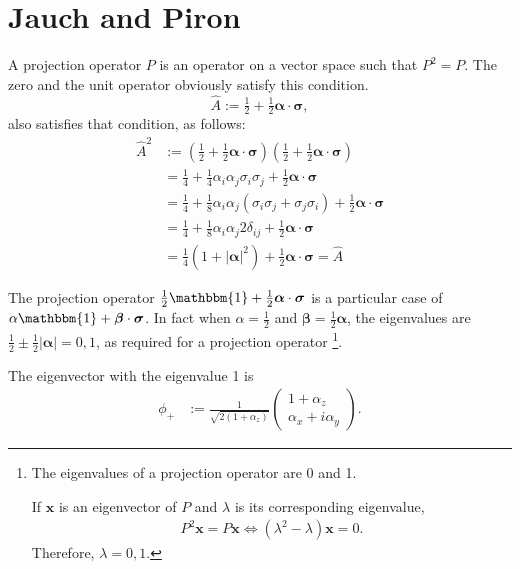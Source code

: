 \documentclass[12pt]{article}
\begin{document}
\section{Jauch and Piron}
A projection operator $P$ is an operator on a vector space such that
$P^2 = P$. The zero and the unit operator obviously satisfy this
condition.
\begin{displaymath}
  \hat{A}:= \tfrac{1}{2}+\tfrac{1}{2}\bm{\alpha}\cdot\bm{\sigma},
\end{displaymath}
also satisfies that condition, as follows:
\begin{align*}
  \hat{A}^2&:= \left(\tfrac{1}{2}+\tfrac{1}{2}\bm{\alpha}\cdot\bm{\sigma}\right)\left(\tfrac{1}{2}+\tfrac{1}{2}\bm{\alpha}\cdot\bm{\sigma}\right)\\
  &=\tfrac{1}{4}+\tfrac{1}{4}\alpha_i\alpha_j\sigma_i\sigma_j+\tfrac{1}{2}\bm{\alpha}\cdot\bm{\sigma}\\
  &=\tfrac{1}{4}+\tfrac{1}{8}\alpha_i\alpha_j(\sigma_i\sigma_j+\sigma_j\sigma_i)+\tfrac{1}{2}\bm{\alpha}\cdot\bm{\sigma}\\
  &=\tfrac{1}{4}+\tfrac{1}{8}\alpha_i\alpha_j2\delta_{ij}+\tfrac{1}{2}\bm{\alpha}\cdot\bm{\sigma}\\
  &=\tfrac{1}{4}(1+|\bm{\alpha}|^2)+\tfrac{1}{2}\bm{\alpha}\cdot\bm{\sigma}=\hat{A}
\end{align*}

The projection operator $\tfrac{1}{2}\mathbbm{1}+\tfrac{1}{2}\bm{\alpha}\cdot\bm{\sigma}$ is a particular case of $\alpha\mathbbm{1}+\bm{\beta}\cdot\bm{\sigma}$. In fact when $\alpha=\tfrac{1}{2}$ and $\bm{\beta}=\tfrac{1}{2}\bm{\alpha}$, the eigenvalues are $\tfrac{1}{2}\pm\tfrac{1}{2}|\bm{\alpha}|=0,1$, as required for a projection operator
\footnote{
The eigenvalues of a projection operator are 0 and 1.

If $\bm{x}$ is an eigenvector of $P$ and $\lambda$ is its corresponding eigenvalue,
\begin{align*}
P^2\bm{x} = P\bm{x} \Leftrightarrow (\lambda^2-\lambda)\bm{x}=0.
\end{align*}
Therefore, $\lambda=0,1$.
}.  

The eigenvector with the eigenvalue 1 is
\begin{align*}
    \phi_{+}
    &:= \frac{1}{\sqrt{2 (1+\alpha_z)}}
    \begin{pmatrix}
      1 +\alpha_z \\
      \alpha_x+i\alpha_y
    \end{pmatrix}.
\end{align*}
\end{document}
